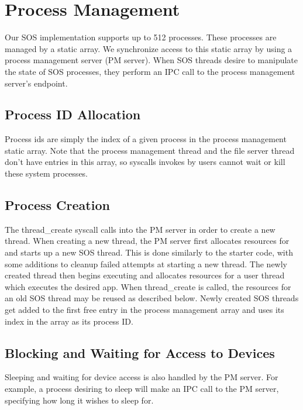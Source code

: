 \section{Process Management}

\noindent
Our SOS implementation supports up to 512 processes.
These processes are managed by a static array.
We synchronize access to this static array by using a process
management server (PM server). When SOS threads desire to manipulate the state of SOS
processes, they perform an IPC call to the process management server's 
endpoint.
\\

\subsection{Process ID Allocation}

\noindent
Process ids are simply the index of a given process in the process management static
array. Note that the process management thread and the file server thread 
don't have entries in this array, so syscalls invokes by users cannot wait or kill
these system processes.
\\

\subsection{Process Creation}

\noindent
The thread\_create syscall calls into the PM server in order to create a new
thread. When creating a new thread, the PM server first allocates resources for
and starts up a new SOS thread. This is done similarly to the starter code, 
with some additions to cleanup failed attempts at starting a new thread. 
The newly created thread then begins executing and allocates resources
for a user thread which executes the desired app. When thread\_create is called,
the resources for an old SOS thread may be reused as described below. Newly created
SOS threads get added to the first free entry in the process management array and
uses its index in the array as its process ID.
\\

\subsection{Blocking and Waiting for Access to Devices}

\noindent
Sleeping and waiting for device access is also handled by the PM
server. For example, a process desiring to sleep will
make an IPC call to the PM server, specifying how long it
wishes to sleep for.
\\

